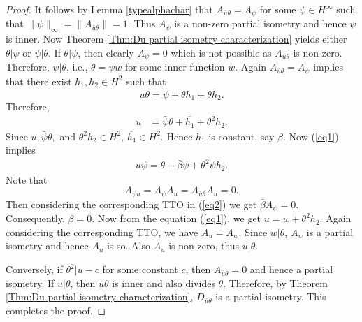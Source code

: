 \documentclass[10pt,a4paper]{amsart}
\newcommand{\h}{{H}^2}
\begin{document}
\begin{proof}
It follows by Lemma \ref{typealphachar} that $A_{\bar{u}\theta}=A_\psi$ for some $\psi \in H^\infty$ such that $\|\psi\|_\infty=\|A_{\bar{u}\theta}\|=1$. Thus $A_{\psi}$ is a non-zero partial isometry and hence $\psi$ is inner. Now Theorem \ref{Thm:Du partial isometry characterization} yields either $\theta | \psi$ or $\psi | \theta$. If $\theta | \psi$, then clearly $A_\psi=0$ which is not possible as $A_{\bar{u}\theta}$ is non-zero. Therefore, $\psi | \theta$, i.e., $\theta=\psi w$ for some inner function $w$.
Again $A_{\bar{u}\theta}=A_\psi$ implies that there exist $h_1, h_2 \in \h$ such that
\[
\bar{u}\theta =\psi +\theta h_1 +\overline{\theta h_2}.
\]
Therefore,
\begin{align} \label{eq1}
u &= \bar{\psi}\theta +\overline{h_1} +\theta^2 h_2.
\end{align}
Since $u, \bar{\psi}\theta,$ and $\theta ^2 h_2 \in \h$, $\overline{h_1} \in \h$. 
Hence $h_1$ is constant, say $\beta$. Now (\ref{eq1}) implies 
\begin{align}\label{eq2}
u\psi=\theta + \bar{\beta} \psi +\theta^2 \psi h_2.
\end{align}
Note that 
\[
A_{\psi u}=A_\psi A_u=A_{\bar{u}\theta}A_u=0. 
\]
Then considering the corresponding TTO in (\ref{eq2}) we get $\bar{\beta} A_\psi=0$. Consequently, $\beta=0$. Now from the equation (\ref{eq1}), we get $u=w +\theta^2 h_2$. Again considering the corresponding TTO, we have $A_u=A_w$. Since $w | \theta$, $A_w$ is a partial isometry and hence $A_u$ is so. Also $A_u$ is non-zero, thus $u | \theta$.

Conversely, if $\theta^2|u-c$ for some constant $c$, then $A_{\bar{u}\theta}=0$ and hence a partial isometry. If $u|\theta$, then $\bar{u}\theta$ is inner and also divides 
$\theta$. Therefore, by Theorem \ref{Thm:Du partial isometry characterization},  $D_{\bar{u}\theta}$ is a partial isometry.
This completes the proof.		
\end{proof}
\end{document}
